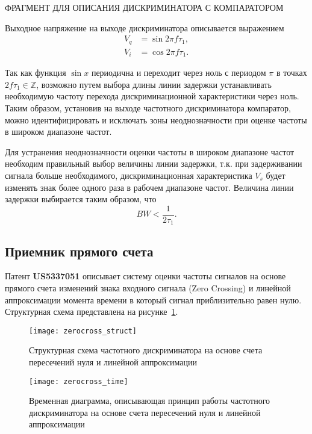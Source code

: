 ФРАГМЕНТ ДЛЯ ОПИСАНИЯ ДИСКРИМИНАТОРА С КОМПАРАТОРОМ

Выходное напряжение на выходе дискриминатора описывается выражением
\begin{equation*}
	\begin{aligned}
		V_{q} &= \sin{2 \pi f \tau_{1}},\\
		V_{i} &= \cos{2 \pi f \tau_{1}}.
	\end{aligned}
\end{equation*}

Так как функция \(\sin{x}\) периодична и переходит через ноль с периодом \(\pi\) в точках \(2 f \tau_{1} \in \mathbb{Z} \), возможно путем выбора длины линии задержки устанавливать необходимую частоту перехода дискриминационной характеристики через ноль. Таким образом, установив на выходе частотного дискриминатора компаратор, можно идентифицировать и исключать зоны неоднозначности при оценке частоты в широком диапазоне частот.

Для устранения неоднозначности оценки частоты в широком диапазоне частот необходим правильный выбор величины линии задержки, т.к. при задерживании сигнала больше необходимого, дискриминационная характеристика \(V_s\) будет изменять знак более одного раза в рабочем диапазоне частот. Величина линии задержки выбирается таким образом, что
\begin{equation*}
	BW < \frac{1}{2 \tau_{1}}.
\end{equation*}



\subsection{Приемник прямого счета}
Патент \textbf{US5337051} описывает систему оценки частоты сигналов на основе прямого счета изменений знака входного сигнала (Zero Crossing) и линейной аппроксимации момента времени в который сигнал приблизительно равен нулю. Структурная схема представлена на рисунке~\ref{ct:zerocross_struct}.
\begin{figure}[ht]
	\centering
	\texttt{[image: zerocross\_struct]}
	
	\caption{Структурная схема частотного дискриминатора на основе счета пересечений нуля и линейной аппроксимации}
	\label{ct:zerocross_struct}
\end{figure}

\begin{figure}[ht]
	\centering
	\texttt{[image: zerocross\_time]}
	
	\caption{Временная диаграмма, описывающая принцип работы частотного дискриминатора на основе счета пересечений нуля и линейной аппроксимации}
	\label{ct:zerocross_time}
\end{figure}

